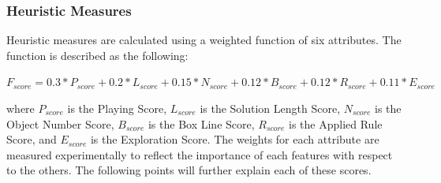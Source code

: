 \subsubsection{Heuristic Measures}
Heuristic measures are calculated using a weighted function of six attributes. The function is described as the following:
\begin{center}$F_{score} = 0.3 * P_{score} + 0.2 * L_{score} + 0.15 * N_{score} + 0.12 * B_{score} + 0.12 * R_{score} + 0.11 * E_{score}$\end{center}
where $P_{score}$ is the Playing Score, $L_{score}$ is the Solution Length Score, $N_{score}$ is the Object Number Score, $B_{score}$ is the Box Line Score, $R_{score}$ is the Applied Rule Score, and $E_{score}$ is the Exploration Score. The weights for each attribute are measured experimentally to reflect the importance of each features with respect to the others. The following points will further explain each of these scores.
